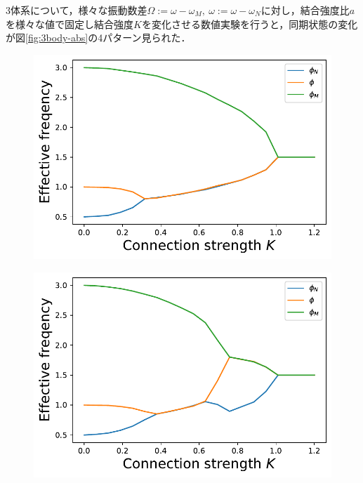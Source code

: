 \documentclass[../main]{subfiles}
\begin{document}
3体系について，様々な振動数差$\Omega:=\omega-\omega_M,\ \omega:=\omega-\omega_N$に対し，結合強度比$a$を様々な値で固定し結合強度$K$を変化させる数値実験を行うと，同期状態の変化が図\ref{fig:3body-abs}の4パターン見られた．
\captionsetup[figure]{justification=centering}
\begin{figure}[tbp]
    \begin{minipage}[b]{0.47\linewidth}
        \centering
        \includegraphics[keepaspectratio, scale=0.42]{images/three-body-prob-notapprox-a150.pdf}
        \label{fig:3body-notapprox150}
    \end{minipage}
    \begin{minipage}[b]{0.47\linewidth}
      \centering
      \includegraphics[keepaspectratio, scale=0.42]{images/three-body-prob-notapprox-a175.pdf}

\end{minipage}
\end{figure}
\end{document}
